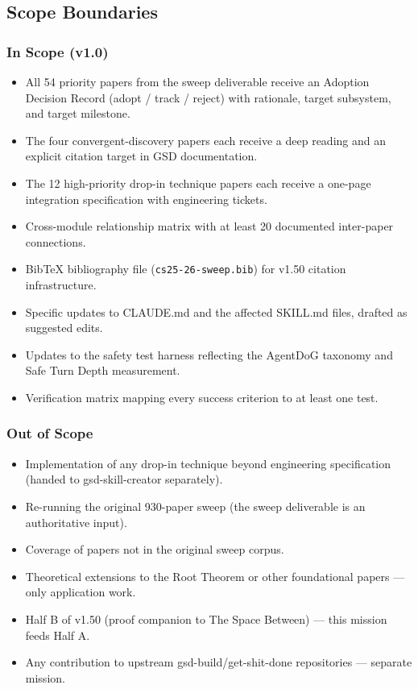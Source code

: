 \documentclass[11pt,letterpaper]{article}
\begin{document}
\subsection{Scope Boundaries}

\subsubsection{In Scope (v1.0)}

\begin{itemize}[leftmargin=*]
\item All 54 priority papers from the sweep deliverable receive an Adoption Decision Record (adopt / track / reject) with rationale, target subsystem, and target milestone.
\item The four convergent-discovery papers each receive a deep reading and an explicit citation target in GSD documentation.
\item The 12 high-priority drop-in technique papers each receive a one-page integration specification with engineering tickets.
\item Cross-module relationship matrix with at least 20 documented inter-paper connections.
\item BibTeX bibliography file (\texttt{cs25-26-sweep.bib}) for v1.50 citation infrastructure.
\item Specific updates to CLAUDE.md and the affected SKILL.md files, drafted as suggested edits.
\item Updates to the safety test harness reflecting the AgentDoG taxonomy and Safe Turn Depth measurement.
\item Verification matrix mapping every success criterion to at least one test.
\end{itemize}

\subsubsection{Out of Scope}

\begin{itemize}[leftmargin=*]
\item Implementation of any drop-in technique beyond engineering specification (handed to gsd-skill-creator separately).
\item Re-running the original 930-paper sweep (the sweep deliverable is an authoritative input).
\item Coverage of papers not in the original sweep corpus.
\item Theoretical extensions to the Root Theorem or other foundational papers --- only application work.
\item Half B of v1.50 (proof companion to The Space Between) --- this mission feeds Half A.
\item Any contribution to upstream gsd-build/get-shit-done repositories --- separate mission.
\end{itemize}
\end{document}

